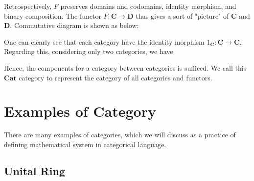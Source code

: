 Retrospectively, $F$ preserves domains and codomains, identity morphism, and binary composition. The functor $F:\mathbf{C}\longrightarrow \mathbf{D}$ thus gives a sort of "picture" of $\mathbf{C}$ and $\mathbf{D}$. Commutative diagram is shown as below: 

\begin{center}
\end{center}


One can clearly see that each category have the identity morphism $1_\mathbf{C}:\mathbf{C}\longrightarrow \mathbf{C}$. Regarding this, considering only two categories, we have 
\begin{center}
\end{center}

Hence, the components for a category between categories is sufficed. We call this $\mathbf{Cat}$ category to represent the category of all categories and functors. 

\section{Examples of Category}

There are many examples of categories, which we will discuss as a practice of defining mathematical system in categorical language. 

\subsection{Unital Ring}

